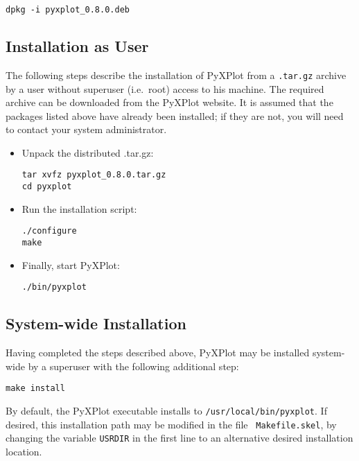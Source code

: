 \begin{verbatim}
dpkg -i pyxplot_0.8.0.deb
\end{verbatim}

\subsection{Installation as User}

The following steps describe the installation of PyXPlot from a {\tt .tar.gz}
archive by a user without superuser (i.e.\ root) access to his machine. The
required archive can be downloaded from the PyXPlot website. It is assumed that
the packages listed above have already been installed; if they are not, you
will need to contact your system administrator.

\begin{itemize}
\item Unpack the distributed .tar.gz:

\begin{verbatim}
tar xvfz pyxplot_0.8.0.tar.gz
cd pyxplot
\end{verbatim}

\item Run the installation script:

\begin{verbatim}
./configure
make
\end{verbatim}

\item Finally, start PyXPlot:

\begin{verbatim}
./bin/pyxplot
\end{verbatim}

\end{itemize}

\subsection{System-wide Installation}

Having completed the steps described above, PyXPlot may be installed
system-wide by a superuser with the following additional
step:

\begin{verbatim}
make install
\end{verbatim}

By default, the PyXPlot executable installs to {\tt /usr/local/bin/pyxplot}.
If desired, this installation path may be modified in the file {\tt
Makefile.skel}, by changing the variable {\tt USRDIR} in the first line to an
alternative desired installation location.

